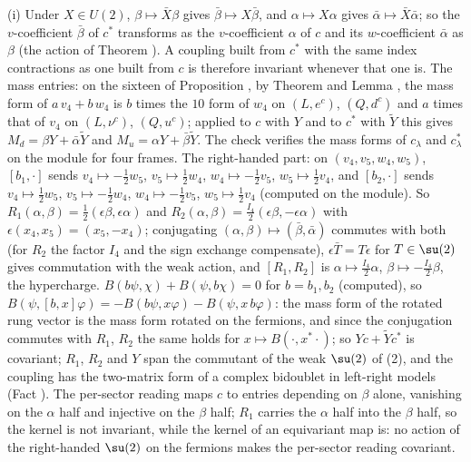 (i) Under $X \in U(2)$, $\beta \mapsto \bar{X}\beta$ gives $\bar{\beta} \mapsto X\bar{\beta}$, and $\alpha \mapsto X\alpha$ gives $\bar{\alpha} \mapsto \bar{X}\bar{\alpha}$; so the $v$-coefficient $\bar{\beta}$ of $c^{*}$ transforms as the $v$-coefficient $\alpha$ of $c$ and its $w$-coefficient $\bar{\alpha}$ as $\beta$ (the action of Theorem ). A coupling built from $c^{*}$ with the same index contractions as one built from $c$ is therefore invariant whenever that one is. The mass entries: on the sixteen of Proposition , by Theorem  and Lemma , the mass form of $a\,v_{4} + b\,w_{4}$ is $b$ times the $10$ form of $w_{4}$ on $(L, e^{c})$, $(Q, d^{c})$ and $a$ times that of $v_{4}$ on $(L, \nu^{c})$, $(Q, u^{c})$; applied to $c$ with $Y$ and to $c^{*}$ with $\tilde{Y}$ this gives $M_{d} = \beta Y + \bar{\alpha}\tilde{Y}$ and $M_{u} = \alpha Y + \bar{\beta}\tilde{Y}$. The check verifies the mass forms of $c_{\lambda}$ and $c_{\lambda}^{*}$ on the module for four frames. The right-handed part: on $(v_{4}, v_{5}, w_{4}, w_{5})$, $[b_{1}, \cdot]$ sends $v_{4} \mapsto -\tfrac12w_{5}$, $v_{5} \mapsto \tfrac12w_{4}$, $w_{4} \mapsto -\tfrac12v_{5}$, $w_{5} \mapsto \tfrac12v_{4}$, and $[b_{2}, \cdot]$ sends $v_{4} \mapsto \tfrac12w_{5}$, $v_{5} \mapsto -\tfrac12w_{4}$, $w_{4} \mapsto -\tfrac12v_{5}$, $w_{5} \mapsto \tfrac12v_{4}$ (computed on the module). So $R_{1}(\alpha, \beta) = \tfrac12(\epsilon\beta, \epsilon\alpha)$ and $R_{2}(\alpha, \beta) = \tfrac{I_{4}}{2}(\epsilon\beta, -\epsilon\alpha)$ with $\epsilon(x_{4}, x_{5}) = (x_{5}, -x_{4})$; conjugating $(\alpha, \beta) \mapsto (\bar{\beta}, \bar{\alpha})$ commutes with both (for $R_{2}$ the factor $I_{4}$ and the sign exchange compensate), $\epsilon\bar{T} = T\epsilon$ for $T \in \su(2)$ gives commutation with the weak action, and $[R_{1}, R_{2}]$ is $\alpha \mapsto \tfrac{I_{4}}{2}\alpha$, $\beta \mapsto -\tfrac{I_{4}}{2}\beta$, the hypercharge. $B(b\psi, \chi) + B(\psi, b\chi) = 0$ for $b = b_{1}, b_{2}$ (computed), so $B(\psi, [b, x]\varphi) = -B(b\psi, x\varphi) - B(\psi, x\,b\varphi)$: the mass form of the rotated rung vector is the mass form rotated on the fermions, and since the conjugation commutes with $R_{1}$, $R_{2}$ the same holds for $x \mapsto B(\cdot, x^{*}\cdot)$; so $Yc + \tilde{Y}c^{*}$ is covariant; $R_{1}$, $R_{2}$ and $Y$ span the commutant of the weak $\su(2)$ of (2), and the coupling has the two-matrix form of a complex bidoublet in left-right models (Fact ). The per-sector reading maps $c$ to entries depending on $\beta$ alone, vanishing on the $\alpha$ half and injective on the $\beta$ half; $R_{1}$ carries the $\alpha$ half into the $\beta$ half, so the kernel is not invariant, while the kernel of an equivariant map is: no action of the right-handed $\su(2)$ on the fermions makes the per-sector reading covariant.

